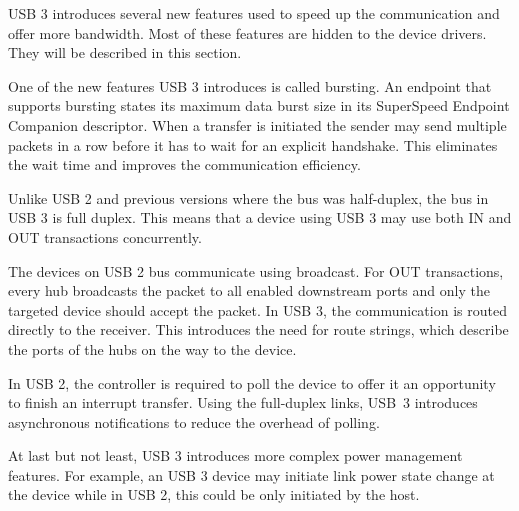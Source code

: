 USB 3 introduces several new features used to speed up the communication and
offer more bandwidth. Most of these features are hidden to the device drivers.
They will be described in this section.

One of the new features USB 3 introduces is called bursting. An endpoint that
supports bursting states its maximum data burst size in its SuperSpeed Endpoint
Companion descriptor. When a transfer is initiated the sender may send multiple
packets in a row before it has to wait for an explicit handshake. This
eliminates the wait time and improves the communication efficiency.

Unlike USB 2 and previous versions where the bus was half-duplex, the bus in USB
3 is full duplex. This means that a device using USB 3 may use both IN and OUT
transactions concurrently.

The devices on USB 2 bus communicate using broadcast. For OUT transactions,
every hub broadcasts the packet to all enabled downstream ports and only the
targeted device should accept the packet. In USB 3, the communication is
routed directly to the receiver. This introduces the need for route strings,
which describe the ports of the hubs on the way to the device.

In USB 2, the controller is required to poll the device to offer it an
opportunity to finish an interrupt transfer. Using the full-duplex links, USB~3
introduces asynchronous notifications to reduce the overhead of polling.

At last but not least, USB 3 introduces more complex power management
features. For example, an USB 3 device may initiate link power state change at
the device while in USB 2, this could be only initiated by the host.

